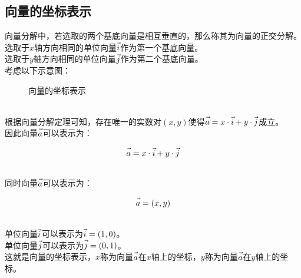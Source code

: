 \documentclass[UTF8]{ctexart}
\let\nvec\vec
\def\vec#1{\nvec{\vphantom b\smash{#1}}}
\begin{document}
\subsection{向量的坐标表示}
    向量分解中，若选取的两个基底向量是相互垂直的，那么称其为向量的正交分解。\\[3mm]
    选取于$x$轴方向相同的单位向量$\vec{i}$作为第一个基底向量。\\[3mm]
    选取于$y$轴方向相同的单位向量$\vec{j}$作为第二个基底向量。\\[3mm]
    考虑以下示意图：
    \begin{figure}[h]
        \begin{center}
            \caption{向量的坐标表示}
        \end{center}
    \end{figure}\\
    根据向量分解定理可知，存在唯一的实数对$(x,y)$使得$\vec{a}=x\cdot\vec{i}+y\cdot\vec{j}$成立。\\[3mm]
    因此向量$\vec{a}$可以表示为：
    \begin{large}
        \begin{equation*}
            \vec{a}=x\cdot\vec{i}+y\cdot\vec{j}
        \end{equation*}
    \end{large}\\
    同时向量$\vec{a}$可以表示为：
    \begin{large}
        \begin{equation*}
            \vec{a}=(x,y)
        \end{equation*}
    \end{large}\\
    单位向量$\vec{i}\hspace{0.5pt}$可以表示为$\vec{i}\hspace{0.5pt}=(1,0)$。\\[3mm]
    单位向量$\vec{j}$可以表示为$\vec{j}=(0,1)$。\\[3mm]
    这就是向量的坐标表示，$x$称为向量$\vec{a}$在$x$轴上的坐标，$y$称为向量$\vec{a}$在$y$轴上的坐标。
\end{document}
